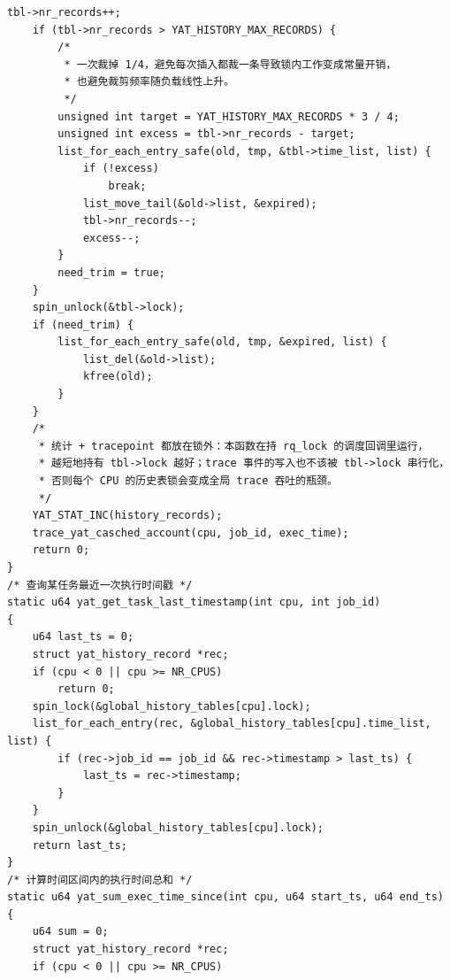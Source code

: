 \documentclass[10pt,a4paper]{article}
\newenvironment{yatpage}{\vspace*{0pt}}{\par}
\begin{document}
\begin{yatpage}
\begin{Verbatim}[fontsize=\fontsize{8.2}{9.8}\selectfont]
    tbl->nr_records++;
    if (tbl->nr_records > YAT_HISTORY_MAX_RECORDS) {
        /*
         * 一次裁掉 1/4，避免每次插入都裁一条导致锁内工作变成常量开销，
         * 也避免裁剪频率随负载线性上升。
         */
        unsigned int target = YAT_HISTORY_MAX_RECORDS * 3 / 4;
        unsigned int excess = tbl->nr_records - target;
        list_for_each_entry_safe(old, tmp, &tbl->time_list, list) {
            if (!excess)
                break;
            list_move_tail(&old->list, &expired);
            tbl->nr_records--;
            excess--;
        }
        need_trim = true;
    }
    spin_unlock(&tbl->lock);
    if (need_trim) {
        list_for_each_entry_safe(old, tmp, &expired, list) {
            list_del(&old->list);
            kfree(old);
        }
    }
    /*
     * 统计 + tracepoint 都放在锁外：本函数在持 rq_lock 的调度回调里运行，
     * 越短地持有 tbl->lock 越好；trace 事件的写入也不该被 tbl->lock 串行化，
     * 否则每个 CPU 的历史表锁会变成全局 trace 吞吐的瓶颈。
     */
    YAT_STAT_INC(history_records);
    trace_yat_casched_account(cpu, job_id, exec_time);
    return 0;
}
/* 查询某任务最近一次执行时间戳 */
static u64 yat_get_task_last_timestamp(int cpu, int job_id)
{
    u64 last_ts = 0;
    struct yat_history_record *rec;
    if (cpu < 0 || cpu >= NR_CPUS)
        return 0;
    spin_lock(&global_history_tables[cpu].lock);
    list_for_each_entry(rec, &global_history_tables[cpu].time_list, list) {
        if (rec->job_id == job_id && rec->timestamp > last_ts) {
            last_ts = rec->timestamp;
        }
    }
    spin_unlock(&global_history_tables[cpu].lock);
    return last_ts;
}
/* 计算时间区间内的执行时间总和 */
static u64 yat_sum_exec_time_since(int cpu, u64 start_ts, u64 end_ts)
{
    u64 sum = 0;
    struct yat_history_record *rec;
    if (cpu < 0 || cpu >= NR_CPUS)
\end{Verbatim}
\end{yatpage}
\newpage
\end{document}
